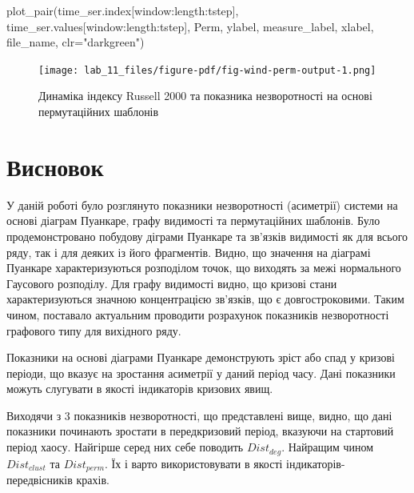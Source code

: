 \documentclass[
  letterpaper,
]{report}
\newenvironment{Shaded}{\begin{snugshade}}{\end{snugshade}}
\newcommand{\NormalTok}[1]{\textcolor[rgb]{0.00,0.23,0.31}{#1}}
\newcommand{\OperatorTok}[1]{\textcolor[rgb]{0.37,0.37,0.37}{#1}}
\newcommand{\StringTok}[1]{\textcolor[rgb]{0.13,0.47,0.30}{#1}}
\begin{document}
\begin{Shaded}
\begin{Highlighting}[]
\NormalTok{plot\_pair(time\_ser.index[window:length:tstep],}
\NormalTok{          time\_ser.values[window:length:tstep],}
\NormalTok{          Perm, }
\NormalTok{          ylabel, }
\NormalTok{          measure\_label,}
\NormalTok{          xlabel,}
\NormalTok{          file\_name, }
\NormalTok{          clr}\OperatorTok{=}\StringTok{"darkgreen"}\NormalTok{)}
\end{Highlighting}
\end{Shaded}

\begin{figure}[H]

{\centering \texttt{[image: lab\_11\_files/figure-pdf/fig-wind-perm-output-1.png]}

}

\caption{\label{fig-wind-perm}Динаміка індексу Russell 2000 та показника
незворотності на основі пермутаційних шаблонів}

\end{figure}

\hypertarget{ux432ux438ux441ux43dux43eux432ux43eux43a-1}{%
\section{Висновок}\label{ux432ux438ux441ux43dux43eux432ux43eux43a-1}}

У даній роботі було розглянуто показники незворотності (асиметрії)
системи на основі діаграм Пуанкаре, графу видимості та пермутаційних
шаблонів. Було продемонстровано побудову діграми Пуанкаре та зв'язків
видимості як для всього ряду, так і для деяких із його фрагментів.
Видно, що значення на діаграмі Пуанкаре характеризуються розподілом
точок, що виходять за межі нормального Гаусового розподілу. Для графу
видимості видно, що кризові стани характеризуються значною концентрацією
зв'язків, що є довгостроковими. Таким чином, поставало актуальним
проводити розрахунок показників незворотності графового типу для
вихідного ряду.

Показники на основі діаграми Пуанкаре демонструють зріст або спад у
кризові періоди, що вказує на зростання асиметрії у даний період часу.
Дані показники можуть слугувати в якості індикаторів кризових явищ.

Виходячи з 3 показників незворотності, що представлені вище, видно, що
дані показники починають зростати в передкризовий період, вказуючи на
стартовий період хаосу. Найгірше серед них себе поводить \(Dist_{deg}\).
Найращим чином \(Dist_{clust}\) та \(Dist_{perm}\). Їх і варто
використовувати в якості індикаторів-передвісників крахів.
\end{document}
